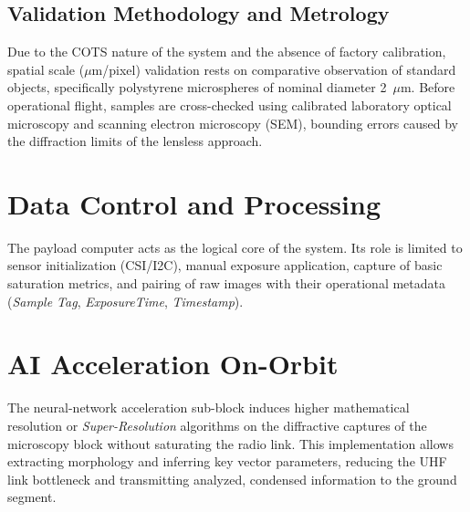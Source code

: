 \subsection{Validation Methodology and Metrology}
Due to the COTS nature of the system and the absence of factory calibration, spatial scale ($\mu$m/pixel) validation rests on comparative observation of standard objects, specifically polystyrene microspheres of nominal diameter 2~$\mu$m. Before operational flight, samples are cross-checked using calibrated laboratory optical microscopy and scanning electron microscopy (SEM), bounding errors caused by the diffraction limits of the lensless approach.

\section{Data Control and Processing}
The payload computer acts as the logical core of the system. Its role is limited to sensor initialization (CSI/I2C), manual exposure application, capture of basic saturation metrics, and pairing of raw images with their operational metadata (\textit{Sample Tag}, \textit{ExposureTime}, \textit{Timestamp}).

\section{AI Acceleration On-Orbit}
The neural-network acceleration sub-block induces higher mathematical resolution or \textit{Super-Resolution} algorithms on the diffractive captures of the microscopy block without saturating the radio link. This implementation allows extracting morphology and inferring key vector parameters, reducing the UHF link bottleneck and transmitting analyzed, condensed information to the ground segment.
